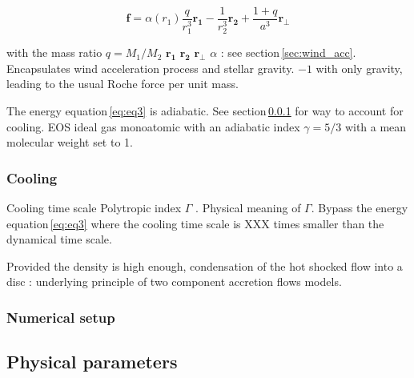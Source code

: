 \documentclass{aa}
\begin{document}
\begin{equation}
\mathbf{f}=\alpha\left( r_1 \right) \frac{q}{r_1^3}\mathbf{r_1} - \frac{1}{r_2^3}\mathbf{r_2} + \frac{1+q}{a^3}\mathbf{r_{\perp}}
\end{equation}

with the mass ratio $q=M_1/M_2$
$\mathbf{r_1}$
$\mathbf{r_2}$
$\mathbf{r_{\perp}}$
$\alpha$ : see section\,\ref{sec:wind_acc}. Encapsulates wind acceleration process and stellar gravity. $-1$ with only gravity, leading to the usual Roche force per unit mass.

The energy equation\,\ref{eq:eq3} is adiabatic. See section\,\ref{sec:cool} for way to account for cooling.
EOS ideal gas monoatomic with an adiabatic index $\gamma=5/3$ with a mean molecular weight set to 1. 



\subsubsection{Cooling}
\label{sec:cool}

Cooling time scale \citep{Schure2009}
Polytropic index $\Gamma$ \citep{Horedt2000}. Physical meaning of $\Gamma$. Bypass the energy equation\,\ref{eq:eq3} where the cooling time scale is XXX times smaller than the dynamical time scale.

Provided the density is high enough, condensation of the hot shocked flow into a disc \citep[][and references therein]{Taam2018} : underlying principle of two component accretion flows models.

\subsubsection{Numerical setup}
\label{sec:num_set}

\subsection{Physical parameters}
\label{sec:params}
\end{document}
